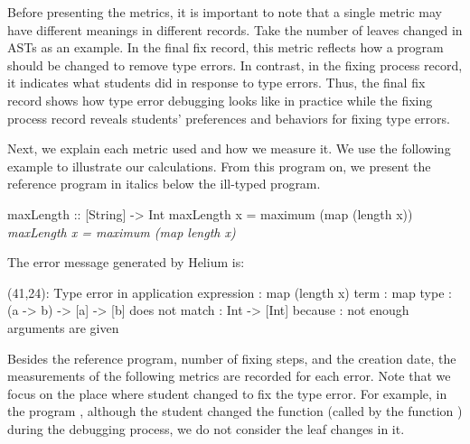 \documentclass[12pt]{report}	%
\begin{document}
Before presenting the metrics,
it is important to note that a single metric may have
different meanings in different records.
Take the number of leaves changed in ASTs as an example.
In the final fix record, this metric reflects how
a program should
be changed to remove type errors.
%
In contrast, in the fixing
process record, it indicates what students did in
response to type errors.
Thus, the final fix record shows how type error debugging
looks like in practice while the fixing process record
reveals students' preferences and behaviors for fixing
type errors.


Next, we explain each metric used and how we measure it.
We use the following example  to illustrate our calculations.
From this program on, we present the reference program in italics below the ill-typed program.
%
\begin{program}
maxLength :: [String] -> Int
maxLength x = maximum (map (length x))
\it{maxLength x = maximum (map length x)}
\end{program}
%
The error message generated by Helium is:
%
\begin{program}
(41,24): Type error in application
 expression       : map (length x)
 term             : map
   type           : (a -> b) -> [a] -> [b]
   does not match : Int      -> [Int]     
 because          : not enough arguments are given
\end{program}


Besides the reference program, number of fixing steps, 
and the creation date,
the measurements of the following metrics are recorded for each error.
Note that we focus on the place where
student changed to fix the type error.
For example, in the program , although the student changed
the function  (called
by the function ) 
during the debugging process,
we do not consider the 
leaf changes in it.
\end{document}
